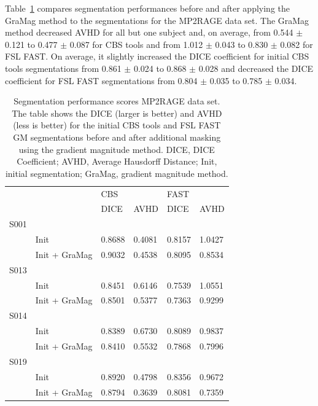 Table~\ref{tab:table2} compares segmentation performances before and after applying the GraMag method to the segmentations for the MP2RAGE data set. The GraMag method decreased AVHD for all but one subject and, on average, from 0.544 $\pm$ 0.121 to 0.477 $\pm$ 0.087 for CBS tools and from 1.012 $\pm$ 0.043 to 0.830 $\pm$ 0.082 for FSL FAST. On average, it slightly increased the DICE coefficient for initial CBS tools segmentations from 0.861 $\pm$ 0.024 to 0.868 $\pm$ 0.028 and decreased the DICE coefficient for FSL FAST segmentations from 0.804 $\pm$ 0.035 to 0.785 $\pm$ 0.034.

\begin{table}[!ht]
\centering
\caption{
Segmentation performance scores MP2RAGE data set. The table shows the DICE (larger is better) and AVHD (less is better) for the initial CBS tools and FSL FAST GM segmentations before and after additional masking using the gradient magnitude method. DICE, DICE Coefficient; AVHD, Average Hausdorff Distance; Init, initial segmentation; GraMag, gradient magnitude method.}
\begin{tabular}{llllll}
\\
\hline
     &                 & \vline CBS   &      & \vline FAST   &      \\
     &                 & \vline DICE  & AVHD & \vline DICE       & AVHD \\
\midrule
 S001 &                &            &            &             &             \\
      & Init           & 0.8688     & 0.4081     & 0.8157      & 1.0427      \\
      & Init + GraMag  & 0.9032     & 0.4538     & 0.8095      & 0.8534      \\
 S013 &                &            &            &             &             \\
      & Init           & 0.8451     & 0.6146     & 0.7539      & 1.0551      \\
      & Init + GraMag  & 0.8501     & 0.5377     & 0.7363      & 0.9299      \\
 S014 &                &            &            &             &             \\
      & Init           & 0.8389     & 0.6730     & 0.8089      & 0.9837      \\
      & Init + GraMag  & 0.8410     & 0.5532     & 0.7868      & 0.7996      \\
 S019 &                &            &            &             &             \\
      & Init           & 0.8920     & 0.4798     & 0.8356      & 0.9672      \\
      & Init + GraMag  & 0.8794     & 0.3639     & 0.8081      & 0.7359      \\
\bottomrule
\end{tabular}
\label{tab:table2}
\end{table}

